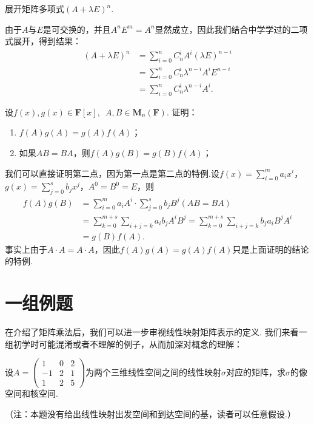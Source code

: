 \begin{example}
    展开矩阵多项式$(A+\lambda E)^n$.
\end{example}

\begin{solution}
    由于$A$与$E$是可交换的，并且$A^nE^m=A^n$显然成立，因此我们结合中学学过的二项式展开，得到结果：
    \begin{align*}
        (A+\lambda E)^n & =\sum_{i=0}^nC_n^iA^i(\lambda E)^{n-i} \\
                        & =\sum_{i=0}^nC_n^i\lambda^{n-i}A^iE^{n-i} \\
                        & =\sum_{i=0}^nC_n^i\lambda^{n-i}A^i.
    \end{align*}
\end{solution}

\begin{example}\label{ex:7:矩阵多项式可交换}
    设$f(x),g(x) \in \mathbf{F}[x],\enspace A,B \in \mathbf{M}_n(\mathbf{F})$. 证明：
    \begin{enumerate}
        \item $f(A)g(A)=g(A)f(A)$；

        \item 如果$AB=BA$，则$f(A)g(B)=g(B)f(A)$；
    \end{enumerate}
\end{example}

\begin{solution}
    我们可以直接证明第二点，因为第一点是第二点的特例.设$f(x)=\sum\limits_{i=0}^ma_ix^i$，$g(x)=\sum\limits_{j=0}^sb_jx^j$，$A^0=B^0=E$，则
    \begin{align*}
        f(A)g(B)&=\sum\limits_{i=0}^ma_iA^i\cdot \sum\limits_{j=0}^sb_jB^j(AB=BA) \\
        &=\sum\limits_{k=0}^{m+s}\sum\limits_{i+j=k}a_ib_jA^iB^j=\sum\limits_{k=0}^{m+s}\sum\limits_{i+j=k}b_ja_iB^jA^i \\
        &=g(B)f(A).
    \end{align*}
    事实上由于$A\cdot A=A\cdot A$，因此$f(A)g(A)=g(A)f(A)$只是上面证明的结论的特例.
\end{solution}

\section{一组例题}

在介绍了矩阵乘法后，我们可以进一步审视线性映射矩阵表示的定义. 我们来看一组初学时可能混淆或者不理解的例子，从而加深对概念的理解：
\begin{example}\label{ex:7:矩阵表示2}
    设$A=\begin{pmatrix}1 & 0 & 2 \\ -1 & 2 & 1 \\ 1 & 2 & 5\end{pmatrix}$为两个三维线性空间之间的线性映射$\sigma$对应的矩阵，求$\sigma$的像空间和核空间.
\end{example}
（注：本题没有给出线性映射出发空间和到达空间的基，读者可以任意假设.）


